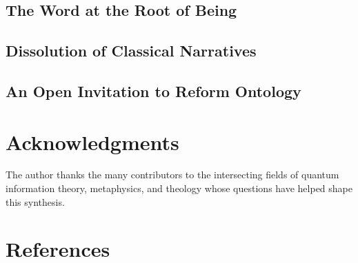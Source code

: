 \documentclass[12pt]{article}
\begin{document}
\subsection{The Word at the Root of Being}
\subsection{Dissolution of Classical Narratives}
\subsection{An Open Invitation to Reform Ontology}

\section*{Acknowledgments}
The author thanks the many contributors to the intersecting fields of quantum information theory, metaphysics, and theology whose questions have helped shape this synthesis.

\section*{References}
\end{document}
